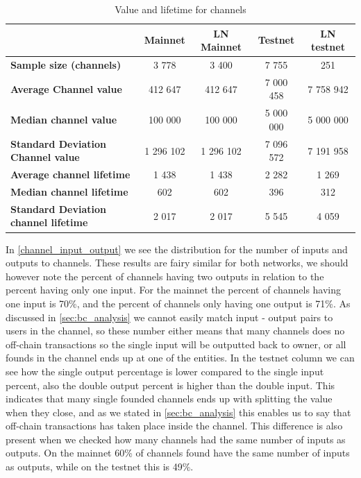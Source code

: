 \begin{table}[]
\centering
\caption{Value and lifetime for channels}
\label{subgraph_stats}
\begin{tabular}{|l|c|c|c|c|}
\hline
                                             & \textbf{Mainnet} & \textbf{LN Mainnet}& \textbf{Testnet} & \textbf{LN testnet} \\ \hline
\textbf{Sample size (channels)}                & 3 778            & 3 400           & 7 755               & 251            \\ \hline
\textbf{Average Channel value}               & 412 647          & 412 647         & 7 000 458            &7 758 942       \\ \hline
\textbf{Median channel value}                & 100 000          & 100 000         & 5 000 000            & 5 000 000        \\ \hline
\textbf{Standard Deviation Channel value}    & 1 296 102        & 1 296 102       & 7 096 572            & 7 191 958        \\ \hline
\textbf{Average channel lifetime}            & 1 438            & 1 438           & 2 282                & 1 269            \\ \hline
\textbf{Median channel lifetime}             & 602              & 602             & 396                  & 312              \\ \hline
\textbf{Standard Deviation channel lifetime} & 2 017            & 2 017           & 5 545                & 4 059            \\ \hline
\end{tabular}
\end{table}

In \cref{channel_input_output} we see the distribution for the number of inputs and outputs to channels. These results are fairy similar for both networks, we should however note the percent of channels having two outputs in relation to the percent having only one input. For the mainnet the percent of channels having one input is 70\%, and the percent of channels only having one output is 71\%. As discussed in \cref{sec:bc_analysis} we cannot easily match input - output pairs to users in the channel, so these number either means that many channels does no off-chain transactions so the single input will be outputted back to owner, or all founds in the channel ends up at one of the entities. In the testnet column we can see how the single output percentage is lower compared to the single input percent, also the double output percent is higher than the double input. This indicates that many single founded channels ends up with splitting the value when they close, and as we stated in \cref{sec:bc_analysis} this enables us to say that off-chain transactions has taken place inside the channel.
This difference is also present when we checked how many channels had the same number of inputs as outputs. On the mainnet 60\% of channels found have the same number of inputs as outputs, while on the testnet this is 49\%. 
\\


